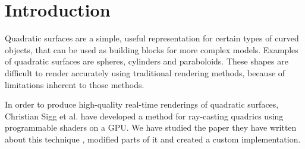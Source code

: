 \section{Introduction}

Quadratic surfaces are a simple, useful representation for certain types of curved objects, that can be used as building blocks for more complex models.
Examples of quadratic surfaces are spheres, cylinders and paraboloids. 
These shapes are difficult to render accurately using traditional rendering methods, because of limitations inherent to those methods.

In order to produce high-quality real-time renderings of quadratic surfaces, Christian Sigg et al. have developed a method for ray-casting quadrics
using programmable shaders on a GPU. 
We have studied the paper they have written about this technique \cite{sigg}, modified parts of it and created a custom implementation.
